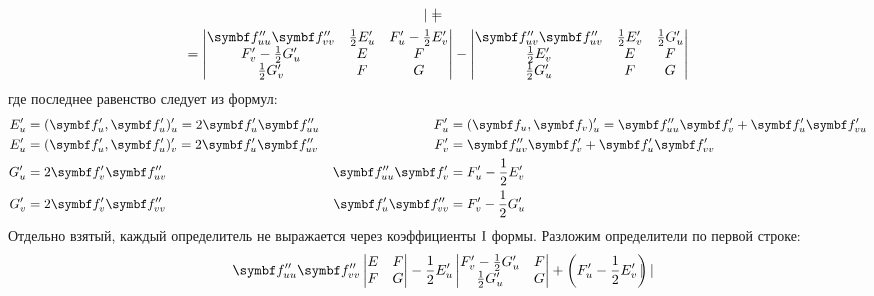 \documentclass[main]{subfiles}
\begin{document}
\begin{longProof}
\begin{multline*}
\begin{vmatrix}
        \end{vmatrix}= \\
        = \begin{vmatrix}
            \vf''_{uu} \vf''_{vv}  & \frac{1}{2}E'_u & F'_u - \frac{1}{2}E'_v \\
            F'_v - \frac{1}{2}G'_u & E               & F                      \\
            \frac{1}{2}G'_v        & F               & G
        \end{vmatrix}-
        \begin{vmatrix}
            \vf''_{uv}\vf''_{uv} & \frac{1}{2} E'_v & \frac{1}{2} G'_u \\
            \frac{1}{2} E'_v     & E                & F                \\
            \frac{1}{2} G'_u     & F                & G
        \end{vmatrix}
    \end{multline*}
    где последнее равенство следует из формул:
    \begin{align*}
        E'_u & = (\vf'_u, \vf'_u)'_u = 2\vf'_u \vf''_{uu} & F'_u              & = (\vf_u, \vf_v)'_u = \vf''_{uu}\vf'_v + \vf'_u \vf'_{vu} \\
        E'_u & = (\vf'_u, \vf'_u)'_v = 2\vf'_u \vf''_{uv} & F'_v              & = \vf''_{uv}\vf'_v + \vf'_u \vf'_{vv}                     \\
        G'_u & = 2 \vf'_v \vf''_{uv}                      & \vf''_{uu}\vf'_v  & = F'_u - \frac{1}{2}E'_v                                  \\
        G'_v & = 2 \vf'_v \vf''_{vv}                      & \vf'_u \vf''_{vv} & = F'_v - \frac{1}{2}G'_u
    \end{align*}
    Отдельно взятый, каждый определитель не выражается через коэффициенты $\mathrm{I}$ формы.
    Разложим определители по первой строке:
    \begin{multline*}
        \vf''_{uu} \vf''_{vv} \begin{vmatrix}
            E & F \\
            F & G
        \end{vmatrix}
        - \frac{1}{2} E'_u \begin{vmatrix}
            F'_v - \frac{1}{2}G'_u & F \\
            \frac{1}{2}G'_u        & G
        \end{vmatrix}
        + \left(F'_u - \frac{1}{2} E'_v\right) \begin{vmatrix}

\end{vmatrix}
\end{multline*}
\end{longProof}
\end{document}
